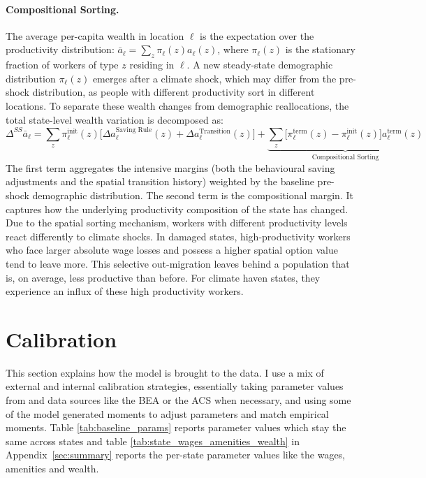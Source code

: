 \documentclass[12pt, a4paper]{article}
\begin{document}
\paragraph{Compositional Sorting.}
The average per-capita wealth in location $\ell$ is the expectation over the productivity distribution: $\bar{a}_\ell = \sum_z \pi_\ell(z) a_\ell(z)$, where $\pi_\ell(z)$ is the stationary fraction of workers of type $z$ residing in $\ell$. A new steady-state demographic distribution $\pi_\ell(z)$ emerges after a climate shock, which may differ from the pre-shock distribution, as people with different productivity sort in different locations. To separate these wealth changes from demographic reallocations, the total state-level wealth variation is decomposed as:
\begin{equation}
    \Delta^{SS} \bar{a}_\ell = \sum_z \pi_\ell^{\text{init}}(z) \big[\Delta a_\ell^{\text{Saving Rule}}(z) + \Delta a_\ell^{\text{Transition}}(z) \big] + \underbrace{\sum_z \big[\pi_\ell^{\text{term}}(z) - \pi_\ell^{\text{init}}(z) \big] a_\ell^{\text{term}}(z)}_{\text{Compositional Sorting}}
    \label{eq:wealth_decomposition}
\end{equation}
The first term aggregates the intensive margins (both the behavioural saving adjustments and the spatial transition history) weighted by the baseline pre-shock demographic distribution. The second term is the compositional margin. It captures how the underlying productivity composition of the state has changed. Due to the spatial sorting mechanism, workers with different productivity levels react differently to climate shocks. In damaged states, high-productivity workers who face larger absolute wage losses and possess a higher spatial option value tend to leave more. This selective out-migration leaves behind a population that is, on average, less productive than before. For climate haven states, they experience an influx of these high productivity workers.

\section{Calibration}
This section explains how the model is brought to the data. I use a mix of external and internal calibration strategies, essentially taking parameter values from \citet{dvorkin_geography_2025} and data sources like the BEA or the ACS when necessary, and using some of the model generated moments to adjust parameters and match empirical moments. Table \ref{tab:baseline_params} reports parameter values which stay the same across states and table \ref{tab:state_wages_amenities_wealth} in Appendix~\ref{sec:summary} reports the per-state parameter values like the wages, amenities and wealth.
\end{document}
